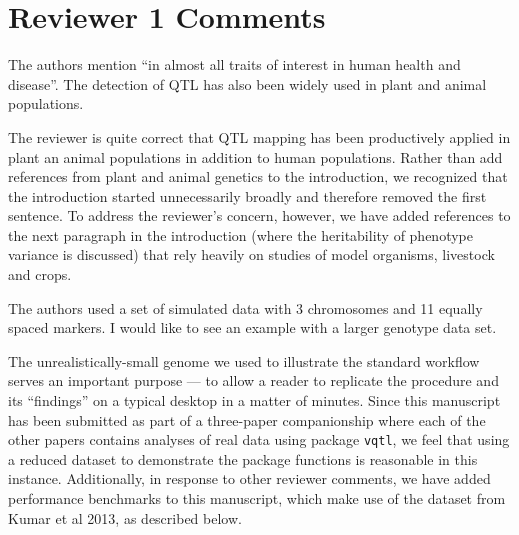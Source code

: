 \documentclass[11pt]{article}
\newcommand{\ReviewerQuestion}[2]{
  \vspace{5pt}\goodbreak
  \noindent\fbox{Reviewer:~#1} #2
  \normalfont\par
}
\newcommand{\Response}[1]{
  \goodbreak
  \textcolor{blue!50!black}{#1}
  \normalfont\par
}
\begin{document}
\section*{Reviewer 1 Comments}

\ReviewerQuestion{1.1}{
  The authors mention ``in almost all traits of interest in human health and disease''.
  The detection of QTL has also been widely used in plant and animal populations.
}
\Response{
  The reviewer is quite correct that QTL mapping has been productively applied in plant an animal populations in addition to human populations.
  Rather than add references from plant and animal genetics to the introduction, we recognized that the introduction started unnecessarily broadly and therefore removed the first sentence.
  To address the reviewer's concern, however, we have added references to the next paragraph in the introduction (where the heritability of phenotype variance is discussed) that rely heavily on studies of model organisms, livestock and crops.
}

\ReviewerQuestion{1.2}{
  The authors used a set of simulated data with 3 chromosomes and 11 equally spaced markers.
  I would like to see an example with a larger genotype data set.
}
\Response{
  The unrealistically-small genome we used to illustrate the standard workflow serves an important purpose --- to allow a reader to replicate the procedure and its ``findings'' on a typical desktop in a matter of minutes.
  Since this manuscript has been submitted as part of a three-paper companionship where each of the other papers contains analyses of real data using package \texttt{vqtl}, we feel that using a reduced dataset to demonstrate the package functions is reasonable in this instance.
  Additionally, in response to other reviewer comments, we have added performance benchmarks to this manuscript, which make use of the dataset from Kumar et al 2013, as described below.
}
\end{document}
